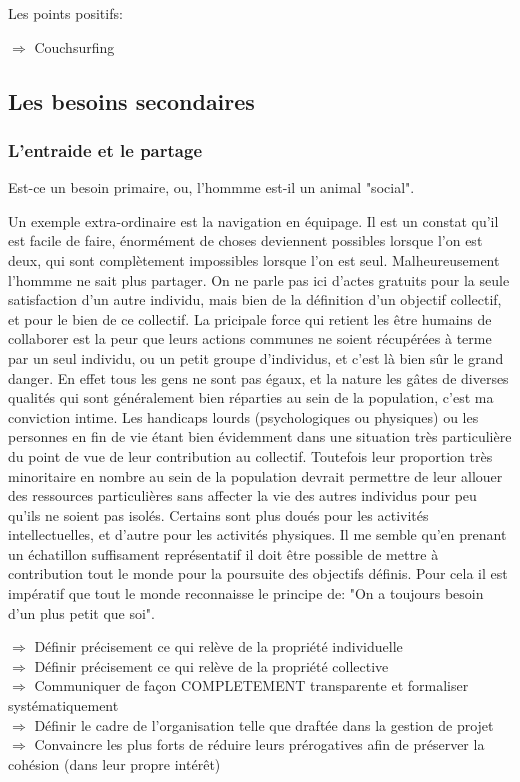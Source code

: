 \documentclass[11pt]{article} %
\begin{document}
Les points positifs:
\begin{flushleft}
$ \Rightarrow $ Couchsurfing\\
\end{flushleft}

\subsection{ Les besoins secondaires}

\subsubsection{L'entraide et le partage}
Est-ce un besoin primaire, ou, l'hommme est-il un animal "social".

Un exemple extra-ordinaire est la navigation en équipage.
Il est un constat qu'il est facile de faire, énormément de choses deviennent possibles lorsque l'on est deux, qui sont complètement impossibles lorsque l'on est seul. Malheureusement l'hommme ne sait plus partager. On ne parle pas ici d'actes gratuits pour la seule satisfaction d'un autre individu, mais bien de la définition d'un objectif collectif, et pour le bien de ce collectif.
La pricipale force qui retient les être humains de collaborer est la peur que leurs actions communes ne soient récupérées à terme par un seul individu, ou un petit groupe d'individus, et c'est là bien sûr le grand danger. 
En effet tous les gens ne sont pas égaux, et la nature les gâtes de diverses qualités qui sont généralement bien réparties au sein de la population, c'est ma conviction intime.
Les handicaps lourds (psychologiques ou physiques) ou les personnes en fin de vie étant bien évidemment dans une situation très particulière du point de vue de leur contribution au collectif.
Toutefois leur proportion très minoritaire en nombre au sein de la population devrait permettre de leur allouer des ressources particulières sans affecter la vie des autres individus pour peu qu'ils ne soient pas isolés.
Certains sont plus doués pour les activités intellectuelles, et d'autre pour les activités physiques. Il me semble qu'en prenant un échatillon suffisament représentatif il doit être possible de mettre à contribution tout le monde pour la poursuite des objectifs définis.
Pour cela il est impératif que tout le monde reconnaisse le principe de: "On a toujours besoin d'un plus petit que soi".\\

\begin{flushleft}
$ \Rightarrow $ Définir précisement ce qui relève de la propriété individuelle\\
$ \Rightarrow $ Définir précisement ce qui relève de la propriété collective\\
$ \Rightarrow $ Communiquer de façon COMPLETEMENT transparente et formaliser systématiquement\\
$ \Rightarrow $ Définir le cadre de l'organisation telle que draftée dans la gestion de projet\\
$ \Rightarrow $ Convaincre les plus forts de réduire leurs prérogatives afin de préserver la cohésion (dans leur propre intérêt)\\
\end{flushleft}
\end{document}
